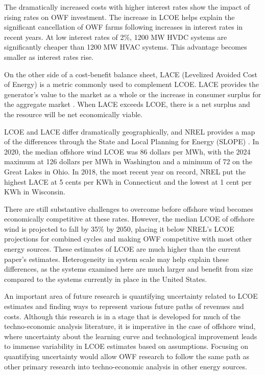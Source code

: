 \documentclass{ieeeaccess}
\begin{document}
The dramatically increased costs with higher interest rates show the impact of rising rates on OWF investment. The increase in LCOE helps explain the significant cancellation of OWF farms following increases in interest rates in recent years. At low interest rates of 2\%, 1200 MW HVDC systems are significantly cheaper than 1200 MW HVAC systems. This advantage becomes smaller as interest rates rise.

On the other side of a cost-benefit balance sheet, LACE (Levelized Avoided Cost of Energy) is a metric commonly used to complement LCOE. LACE provides the generator's value to the market as a whole or the increase in consumer surplus for the aggregate market \cite{kabeyi2023levelized}. When LACE exceeds LCOE, there is a net surplus and the resource will be net economically viable.

LCOE and LACE differ dramatically geographically, and NREL provides a map of the differences through the State and Local Planning for Energy (SLOPE) \cite{day2022state}. In 2020, the median offshore wind LCOE was 86 dollars per MWh, with the 2024 maximum at 126 dollars per MWh in Washington and a minimum of 72 on the Great Lakes in Ohio. In 2018, the most recent year on record, NREL put the highest LACE at 5 cents per KWh in Connecticut and the lowest at 1 cent per KWh in Wisconsin.

There are still substantive challenges to overcome before offshore wind becomes economically competitive at these rates. However, the median LCOE of offshore wind is projected to fall by 35\% by 2050, placing it below NREL's LCOE projections for combined cycles and making OWF competitive with most other energy sources. These estimates of LCOE are much higher than the current paper's estimates. Heterogeneity in system scale may help explain these differences, as the systems examined here are much larger and benefit from size compared to the systems currently in place in the United States.

An important area of future research is quantifying uncertainty related to LCOE estimates and finding ways to represent various future paths of revenues and costs. Although this research is in a stage that is developed for much of the techno-economic analysis literature, it is imperative in the case of offshore wind, where uncertainty about the learning curve and technological improvement leads to immense variability in LCOE estimates based on assumptions. Focusing on quantifying uncertainty would allow OWF research to follow the same path as other primary research into techno-economic analysis in other energy sources.
\end{document}
